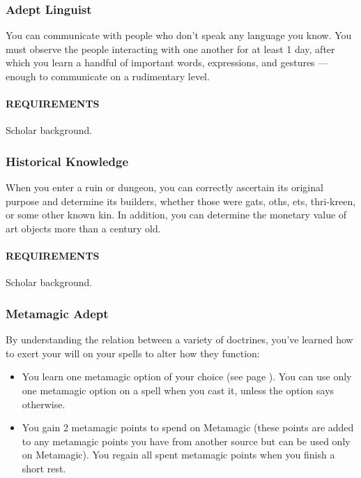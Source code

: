     \subsubsection{Adept Linguist} \label{feat::adeptlinguist}
        You can communicate with people who don't speak any language you know.
        You must observe the people interacting with one another for at least 1 day, after which you learn a handful of important words, expressions, and gestures --- enough to communicate on a rudimentary level.
        \paragraph{REQUIREMENTS} Scholar background.

    \subsubsection{Historical Knowledge} \label{feat::historicalknowledge}
        When you enter a ruin or dungeon, you can correctly ascertain its original purpose and determine its builders, whether those were gats, oths, ets, thri-kreen, or some other known kin.
        In addition, you can determine the monetary value of art objects more than a century old.
        \paragraph{REQUIREMENTS} Scholar background.

    \subsubsection{Metamagic Adept} \label{feat::metamagicadept}
        By understanding the relation between a variety of doctrines, you've learned how to exert your will on your spells to alter how they function:
        \begin{itemize}
            \item You learn one metamagic option of your choice (see page \pageref{ssec::metamagic}).
            You can use only one metamagic option on a spell when you cast it, unless the option says otherwise.
            \item You gain 2 metamagic points to spend on Metamagic (these points are added to any metamagic points you have from another source but can be used only on Metamagic).
            You regain all spent metamagic points when you finish a short rest.
        \end{itemize}

